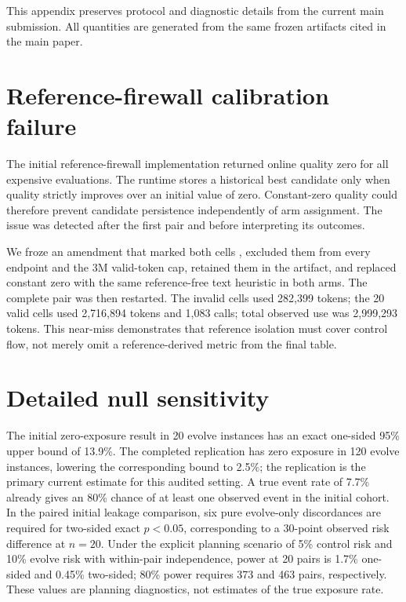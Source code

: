 \appendix
\sloppy

This appendix preserves protocol and diagnostic details from the current main submission. All quantities are generated from the same frozen artifacts cited in the main paper.

\section{Reference-firewall calibration failure}

The initial reference-firewall implementation returned online quality zero for all expensive evaluations. The runtime stores a historical best candidate only when quality strictly improves over an initial value of zero. Constant-zero quality could therefore prevent candidate persistence independently of arm assignment. The issue was detected after the first pair and before interpreting its outcomes.

We froze an amendment that marked both cells \texttt{}, excluded them from every endpoint and the 3M valid-token cap, retained them in the artifact, and replaced constant zero with the same reference-free text heuristic in both arms. The complete pair was then restarted. The invalid cells used 282,399 tokens; the 20 valid cells used 2,716,894 tokens and 1,083 calls; total observed use was 2,999,293 tokens. This near-miss demonstrates that reference isolation must cover control flow, not merely omit a reference-derived metric from the final table.

\section{Detailed null sensitivity}

The initial zero-exposure result in 20 evolve instances has an exact one-sided 95\% upper bound of 13.9\%. The completed replication has zero exposure in 120 evolve instances, lowering the corresponding bound to 2.5\%; the replication is the primary current estimate for this audited setting. A true event rate of 7.7\% already gives an 80\% chance of at least one observed event in the initial cohort. In the paired initial leakage comparison, six pure evolve-only discordances are required for two-sided exact \(p<0.05\), corresponding to a 30-point observed risk difference at \(n=20\). Under the explicit planning scenario of 5\% control risk and 10\% evolve risk with within-pair independence, power at 20 pairs is 1.7\% one-sided and 0.45\% two-sided; 80\% power requires 373 and 463 pairs, respectively. These values are planning diagnostics, not estimates of the true exposure rate.

